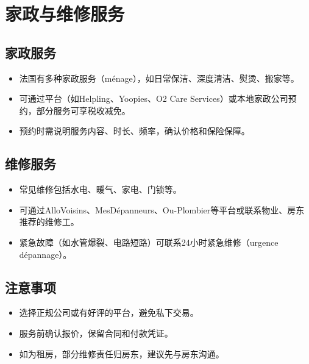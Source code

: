 \section{家政与维修服务}

\subsection{家政服务}
\begin{itemize}
    \item 法国有多种家政服务（ménage），如日常保洁、深度清洁、熨烫、搬家等。
    \item 可通过平台（如Helpling、Yoopies、O2 Care Services）或本地家政公司预约，部分服务可享税收减免。
    \item 预约时需说明服务内容、时长、频率，确认价格和保险保障。
\end{itemize}

\subsection{维修服务}
\begin{itemize}
    \item 常见维修包括水电、暖气、家电、门锁等。
    \item 可通过AlloVoisins、MesDépanneurs、Ou-Plombier等平台或联系物业、房东推荐的维修工。
    \item 紧急故障（如水管爆裂、电路短路）可联系24小时紧急维修（urgence dépannage）。
\end{itemize}

\subsection{注意事项}
\begin{itemize}
    \item 选择正规公司或有好评的平台，避免私下交易。
    \item 服务前确认报价，保留合同和付款凭证。
    \item 如为租房，部分维修责任归房东，建议先与房东沟通。
\end{itemize}
